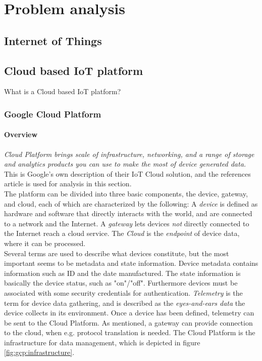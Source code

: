 \section{Problem analysis}
\subsection{Internet of Things}
\subsection{Cloud based IoT platform}
What is a Cloud based IoT platform? 

\subsubsection{Google Cloud Platform}
\paragraph{Overview} 
\textit{Cloud Platform brings scale of infrastructure, networking, and a range of storage and analytics products you can use to make the most of device generated data.}\cite{website:gcp}
This is Google's own description of their IoT Cloud solution, and the references article is used for analysis in this section. \\

The platform can be divided into three basic components, the device, gateway, and cloud, each of which are characterized by the following: A \textit{device} is defined as hardware and software that directly interacts with the world, and are connected to a network and the Internet. A \textit{gateway} lets devices \textit{not} directly connected to the Internet reach a cloud service. The \textit{Cloud} is the \textit{endpoint} of device data, where it can be processed.\\

Several terms are used to describe what devices constitute, but the most important seems to be metadata and state information. Device metadata contains information such as ID and the date manufactured. The state information is basically the device status, such as "on"/"off". Furthermore devices must be associated with some security credentials for authentication. \textit{Telemetry} is the term for device data gathering, and is described as the \textit{eyes-and-ears data} the device collects in its environment. Once a device has been defined, telemetry can be sent to the Cloud Platform. As mentioned, a gateway can provide connection to the cloud, when e.g. protocol translation is needed. The Cloud Platform is the infrastructure for data management, which is depicted in figure \ref{fig:gcp:infrastructure}.

